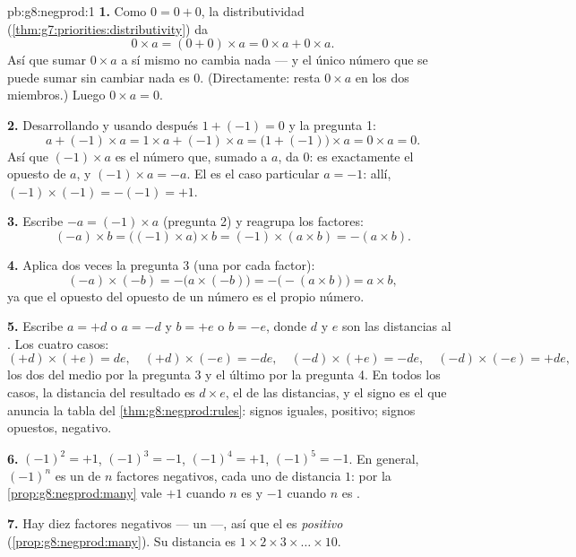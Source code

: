 \begin{solution}{pb:g8:negprod:1}
\textbf{1.} Como $0 = 0 + 0$, la distributividad
(\cref{thm:g7:priorities:distributivity}) da
\[
0 \times a = (0 + 0) \times a = 0 \times a + 0 \times a .
\]
Así que sumar $0 \times a$ a sí mismo no cambia nada --- y el único
número que se puede sumar sin cambiar nada es $0$. (Directamente:
resta $0 \times a$ en los dos miembros.) Luego $0 \times a = 0$.

\textbf{2.} Desarrollando y usando después $1 + (-1) = 0$ y la pregunta 1:
\[
a + (-1) \times a
= 1 \times a + (-1) \times a
= \bigl(1 + (-1)\bigr) \times a
= 0 \times a = 0 .
\]
Así que $(-1) \times a$ es el número que, sumado a $a$, da $0$:
es exactamente el opuesto de $a$, y $(-1) \times a = -a$.
El  es el caso particular $a = -1$: allí,
$(-1) \times (-1) = -(-1) = +1$.

\textbf{3.} Escribe $-a = (-1) \times a$ (pregunta 2) y reagrupa los
factores:
\[
(-a) \times b
= \bigl((-1) \times a\bigr) \times b
= (-1) \times (a \times b)
= -(a \times b) .
\]

\textbf{4.} Aplica dos veces la pregunta 3 (una por cada factor):
\[
(-a) \times (-b)
= -\bigl(a \times (-b)\bigr)
= -\bigl(-(a \times b)\bigr)
= a \times b ,
\]
ya que el opuesto del opuesto de un número es el propio número.

\textbf{5.} Escribe $a = +d$ o $a = -d$ y $b = +e$ o $b = -e$,
donde $d$ y $e$ son las distancias al . Los cuatro casos:
\[
(+d) \times (+e) = de, \quad
(+d) \times (-e) = -de, \quad
(-d) \times (+e) = -de, \quad
(-d) \times (-e) = +de,
\]
los dos del medio por la pregunta 3 y el último por la pregunta 4. En todos los casos,
la distancia del resultado es $d \times e$, el  de las
distancias, y el signo es el que anuncia la tabla del
\cref{thm:g8:negprod:rules}: signos iguales, positivo; signos opuestos,
negativo.

\textbf{6.} $(-1)^2 = +1$, $(-1)^3 = -1$, $(-1)^4 = +1$,
$(-1)^5 = -1$. En general, $(-1)^n$ es un  de $n$ factores
negativos, cada uno de distancia $1$: por la \cref{prop:g8:negprod:many} vale
$+1$ cuando $n$ es  y $-1$ cuando $n$ es .

\textbf{7.} Hay diez factores negativos --- un  ---, así que
el  es \emph{positivo} (\cref{prop:g8:negprod:many}). Su
distancia es $1 \times 2 \times 3 \times \dots \times 10$.


\end{solution}
